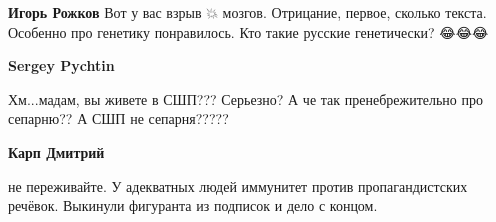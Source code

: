 \begin{itemize}
\begin{itemize}
\textbf{Игорь Рожков} Вот у вас взрыв 💥 мозгов. Отрицание, первое, сколько текста. Особенно про генетику понравилось. Кто такие русские генетически? 😂😂😂

 
\textbf{Sergey Pychtin} 

Хм...мадам, вы живете в СШП??? Серьезно? А че так пренебрежительно про
сепарню?? А СШП не сепарня?????


 
\textbf{Карп Дмитрий} 

не переживайте. У адекватных людей иммунитет против пропагандистских речёвок.
Выкинули фигуранта из подписок и дело с концом.

\end{itemize}

\end{itemize}

